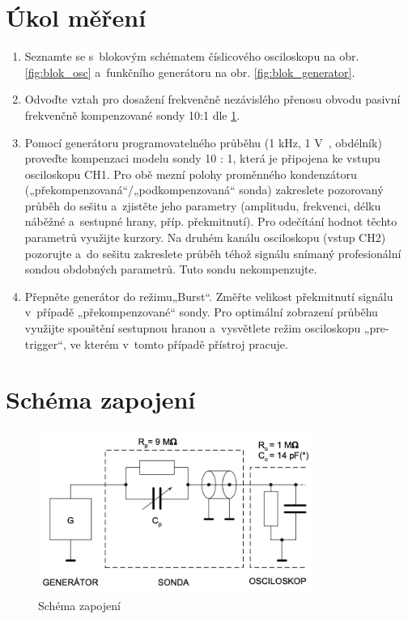 \documentclass[a4paper,12pt]{article}   %
\begin{document}
\section{Úkol měření}
\label{chap:ukol}
\begin{enumerate}
        \item Seznamte se s~blokovým schématem číslicového osciloskopu na obr. \ref{fig:blok_osc} a~funkčního generátoru na obr. \ref{fig:blok_generator}.
        \item  Odvoďte vztah pro dosažení frekvenčně nezávislého přenosu obvodu pasivní frekvenčně kompenzované sondy 10:1 dle \ref{fig:schema}.
        \item Pomocí generátoru programovatelného průběhu (1 kHz, 1 V~, obdélník) proveďte kompenzaci modelu sondy 10 : 1, která je připojena ke vstupu osciloskopu CH1. Pro obě mezní polohy proměnného kondenzátoru („překompenzovaná“/„podkompenzovaná“ sonda) zakreslete pozorovaný průběh do sešitu a~zjistěte jeho parametry (amplitudu, frekvenci, délku náběžné a~sestupné hrany, příp. překmitnutí). Pro odečítání hodnot těchto parametrů využijte kurzory.
        Na druhém kanálu osciloskopu (vstup CH2) pozorujte a~do sešitu zakreslete průběh téhož signálu snímaný profesionální sondou obdobných parametrů. Tuto sondu nekompenzujte.
        \item Přepněte generátor do režimu„Burst“. Změřte velikost překmitnutí signálu v~případě „překompenzované“ sondy. Pro optimální zobrazení průběhu využijte spouštění sestupnou hranou a~vysvětlete režim osciloskopu „pre-trigger“, ve kterém v~tomto případě přístroj pracuje.
\end{enumerate}


\section{Schéma zapojení}
\label{chap:schema_zapojeni}
\begin{figure}[h!]
  \centering
  \includegraphics[width = 0.8\textwidth]{schema_zapojeni.png}
  \caption{Schéma zapojení}
  \label{fig:schema}
\end{figure}
\end{document}

